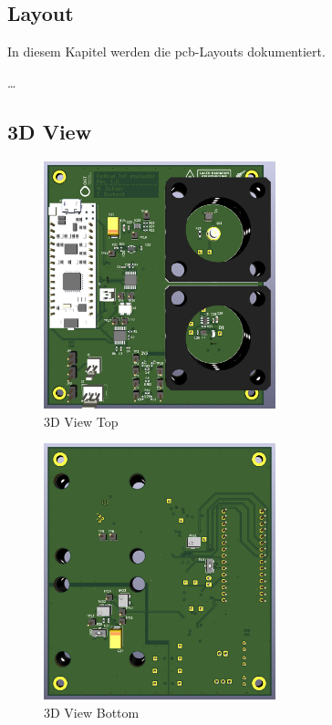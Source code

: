 \documentclass[11pt,a4paper,hidelinks]{article}
\begin{document}
\pagebreak

\subsection{Layout}

In diesem Kapitel werden die \acrshort{pcb}-Layouts dokumentiert.

\dots

\pagebreak

\subsection{3D View}

\begin{figure}[H]
    \centering
    \includegraphics[width=0.6\textwidth]{graphics/3d_top.png}
    \caption{3D View Top}\label{fig:3d_top}
\end{figure}

\begin{figure}[H]
    \centering
    \includegraphics[width=0.6\textwidth]{graphics/3d_bottom.png}
    \caption{3D View Bottom}\label{fig:3d_bottom}
\end{figure}
\end{document}
